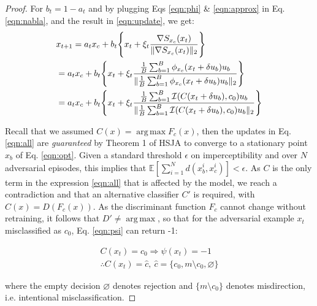 \begin{proof}
For $b_t = 1- a_t$ and by plugging Eqs \ref{eqn:phi} \& \ref{eqn:approx} in Eq. \ref{eqn:nabla}, and the result in \ref{eqn:update}, we get:
\begin{align}
    &x_{t+1} = a_{t}x_c + b_t\Biggl\{x_t + \xi_t \frac{\nabla S_{x_c}(x_t)}{\|\nabla S_{x_c}(x_t)\|_2}\Biggl\} \notag \\
    &= a_{t}x_c 
    + b_t\Biggl\{x_t + \xi_t \frac{\frac{1}{B} \sum_{b=1}^{B} \phi_{x_c}(x_t + \delta u_b)u_b}{\|\frac{1}{B} \sum_{b=1}^{B} \phi_{x_c}(x_t + \delta u_b)u_b\|_2}\Biggl\} \label{eqn:all} \\
    &= a_{t}x_c + b_t\Biggl\{x_t + \xi_t \frac{\frac{1}{B} \sum_{b=1}^{B} \mathcal{I}(C(x_t + \delta u_b), c_0)u_b}{\|\frac{1}{B} \sum_{b=1}^{B} \mathcal{I}(C(x_t + \delta u_b), c_0)u_b\|_2}\Biggl\} \notag
\end{align}

Recall that we assumed $C(x)=\operatorname*{arg\,max} F_c(x)$, then the updates in Eq. \eqref{eqn:all} are \textit{guaranteed} by Theorem 1 of HSJA \cite{chen2020hopskipjumpattack} to converge to a stationary point $x_b$ of Eq. \eqref{eqn:opt}.
Given a standard threshold $\epsilon$ on imperceptibility and over $N$ adversarial episodes, this implies that $\mathbb{E}[\sum_{i=1}^{N}d(x^i_b,x^i_c)] < \epsilon$.
As $C$ is the only term in the expression \eqref{eqn:all} that is affected by the model, we reach a contradiction and that an alternative classifier $C'$ is required, with $C(x)=D(F_c(x))$.
As the discriminant function $F_c$ cannot change without retraining, it follows that $D'\neq \operatorname*{arg\,max}$, so that for the adversarial example $x_t$ misclassified as $c_0$, Eq. \ref{eqn:psi} can return -1:


\begin{equation}
\begin{aligned}
    C(x_t) = c_0  \Rightarrow \psi(x_t) = -1 \\
    \therefore C(x_t) = \hat{c}, \: \hat{c} = \{c_0, m\setminus c_0, \varnothing\}
\end{aligned}
\end{equation}

\noindent where the empty decision $\varnothing$ denotes rejection and $\{ m\setminus c_0\}$ denotes misdirection, i.e. intentional misclassification.


\end{proof}
